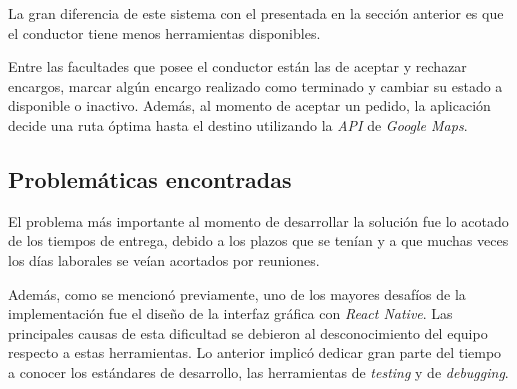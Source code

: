     La gran diferencia de este sistema con el presentada en la sección anterior es que el 
    conductor tiene menos herramientas disponibles.
    
    Entre las facultades que posee el conductor están las de aceptar y rechazar encargos,
    marcar algún encargo realizado como terminado y cambiar su estado a disponible o 
    inactivo.
    Además, al momento de aceptar un pedido, la aplicación decide una ruta óptima hasta 
    el destino utilizando la \textit{API} de \textit{Google Maps}.
  
  \subsection{Problemáticas encontradas}
    El problema más importante al momento de desarrollar la solución fue lo acotado de 
    los tiempos de entrega, debido a los plazos que se tenían y a que muchas veces los 
    días laborales se veían acortados por reuniones.

    Además, como se mencionó previamente, uno de los mayores desafíos de la 
    implementación fue el diseño de la interfaz gráfica con \textit{React Native}.
    Las principales causas de esta dificultad se debieron al desconocimiento del equipo 
    respecto a estas herramientas. 
    Lo anterior implicó dedicar gran parte del tiempo a conocer los estándares de 
    desarrollo, las herramientas de \textit{testing} y de \textit{debugging}.
